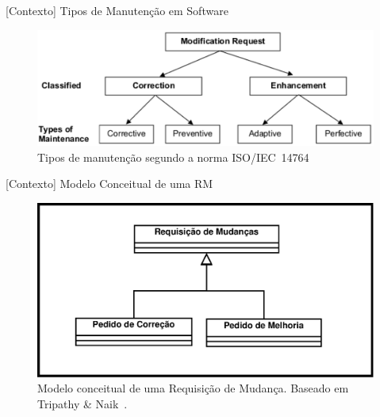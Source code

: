 \documentclass[t,14pt,mathserif]{beamer}
\begin{document}
\begin{frame}{[Contexto] Tipos de Manutenção em Software}

    \begin{figure}[hbtp]
        \centering
        \includegraphics[width=.75\textwidth]{../img/modification_request.eps}
        \caption{Tipos de manutenção segundo a norma
                 ISO/IEC~14764~\cite{1703974}}
\label{fig:modification-request}
    \end{figure}

\end{frame}

\begin{frame}{[Contexto] Modelo Conceitual de uma RM}
        \begin{figure}[htpb]
            \centering
            \includegraphics[width=0.75\linewidth]{../img/diagrama-classe-conceitual-requisicao-mudancas.pdf}
                \caption{Modelo conceitual de uma Requisição de Mudança.
                         Baseado em Tripathy \&
                         Naik~\cite{tripathy2014software}.}
\label{fig:diagrama-classe-requisicao-mudancas}
        \end{figure}
\end{frame}
\end{document}
